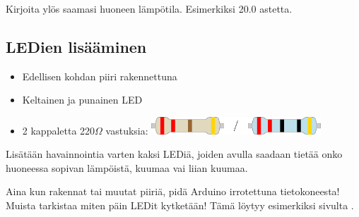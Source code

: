 \begin{tcolorbox}[colback=yellow!10, title={Lämpötila},colbacktitle=orange]
Kirjoita ylös saamasi huoneen lämpötila. Esimerkiksi 20.0 astetta.
\end{tcolorbox}

\subsection{LEDien lisääminen}\label{sec:lampo}
\begin{minipage}{0.5\textwidth}
\begin{tcolorbox}[colback=lime!10,title=Tarvikkeet, colbacktitle=green!10,coltitle=black]
\begin{itemize}
    \item Edellisen kohdan piiri rakennettuna
    \item Keltainen ja punainen LED
    \item 2 kappaletta 220$\Omega$ vastuksia:   \includegraphics[width=0.5\textwidth]{kuvat/220.pdf}
\end{itemize}
\end{tcolorbox}
\end{minipage}
\begin{minipage}{0.5\textwidth}
\begin{tcolorbox}[colback=blue!10,title=Piirin toiminta,colbacktitle=purple!90]
Lisätään havainnointia varten kaksi LEDiä, joiden avulla saadaan tietää onko huoneessa sopivan lämpöistä, kuumaa vai liian kuumaa.
\tcblower
\begin{center}
\end{center}
\end{tcolorbox}
\end{minipage}

\begin{tcolorbox}[colback=red!10,colbacktitle=red,title=HUOM!]
Aina kun rakennat tai muutat piiriä, pidä Arduino irrotettuna tietokoneesta! 
\tcblower
Muista tarkistaa miten päin LEDit kytketään! Tämä löytyy esimerkiksi sivulta \pageref{box:led}.
\end{tcolorbox}

